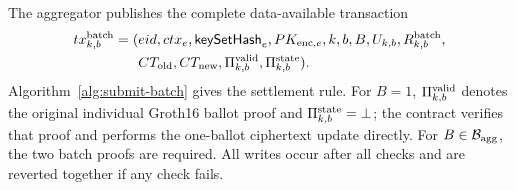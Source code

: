 \documentclass[pdflatex,sn-mathphys-num]{sn-jnl}%
\theoremstyle{thmstyleone}%
\theoremstyle{thmstyletwo}%
\theoremstyle{thmstylethree}%
\begin{document}
The aggregator publishes the complete data-available transaction
\[
\begin{aligned}
 tx^{\rm batch}_{k,b}=(&eid,ctx_e,\mathsf{keySetHash}_e,PK_{{\rm enc},e},
 k,b,B,U_{k,b},R^{\rm batch}_{k,b},\\
 &CT_{\rm old},CT_{\rm new},\Pi^{\rm valid}_{k,b},
 \Pi^{\rm state}_{k,b}).
\end{aligned}
\]
Algorithm~\ref{alg:submit-batch} gives the settlement rule. For $B=1$, $\Pi^{\rm valid}_{k,b}$ denotes the original individual Groth16 ballot proof and $\Pi^{\rm state}_{k,b}=\bot$; the contract verifies that proof and performs the one-ballot ciphertext update directly. For $B\in\mathcal B_{\rm agg}$, the two batch proofs are required. All writes occur after all checks and are reverted together if any check fails.
\end{document}
